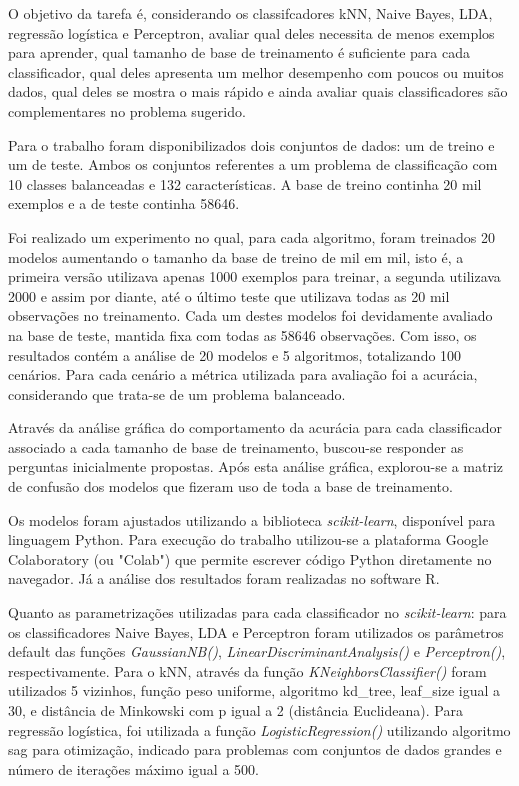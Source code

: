 \documentclass[
	12pt,				%
	openright,			%
	twoside,			%
	a4paper,			%
	english,			%
	brazil,				%
	svgnames
	]{abntex2}\usepackage[]{graphicx}\usepackage[]{color}
\begin{document}
O objetivo da tarefa é, considerando os classifcadores kNN, Naive Bayes, LDA, regressão logística e Perceptron, avaliar qual deles necessita de menos exemplos para aprender, qual tamanho de base de treinamento é suficiente para cada classificador, qual deles apresenta um melhor desempenho com poucos ou muitos dados, qual deles se mostra o mais rápido e ainda avaliar quais classificadores são complementares no problema sugerido.

Para o trabalho foram disponibilizados dois conjuntos de dados: um de treino e um de teste. Ambos os conjuntos referentes a um problema de classificação com 10 classes balanceadas e 132 características. A base de treino continha 20 mil exemplos e a de teste continha 58646.

Foi realizado um experimento no qual, para cada algoritmo, foram treinados 20 modelos aumentando o tamanho da base de treino de mil em mil, isto é, a primeira versão utilizava apenas 1000 exemplos para treinar, a segunda utilizava 2000 e assim por diante, até o último teste que utilizava todas as 20 mil observações no treinamento. Cada um destes modelos foi devidamente avaliado na base de teste, mantida fixa com todas as 58646 observações. Com isso, os resultados contém a análise de 20 modelos e 5 algoritmos, totalizando 100 cenários. Para cada cenário a métrica utilizada para avaliação foi a acurácia, considerando que trata-se de um problema balanceado.

Através da análise gráfica do comportamento da acurácia para cada classificador associado a cada tamanho de base de treinamento, buscou-se responder as perguntas inicialmente propostas. Após esta análise gráfica, explorou-se a matriz de confusão dos modelos que fizeram uso de toda a base de treinamento. 

Os modelos foram ajustados utilizando a biblioteca \emph{scikit-learn}, disponível para linguagem Python. Para execução do trabalho utilizou-se a plataforma Google Colaboratory (ou "Colab") que permite escrever código Python diretamente no navegador. Já a análise dos resultados foram realizadas no software R.

Quanto as parametrizações utilizadas para cada classificador no \emph{scikit-learn}: para os classificadores Naive Bayes, LDA e Perceptron foram utilizados os parâmetros default das funções \emph{GaussianNB()}, \emph{LinearDiscriminantAnalysis()} e \emph{Perceptron()}, respectivamente. Para o kNN, através da função \emph{KNeighborsClassifier()} foram utilizados 5 vizinhos, função peso uniforme, algoritmo kd\_tree, leaf\_size igual a 30, e distância de Minkowski com p igual a 2 (distância Euclideana). Para regressão logística, foi utilizada a função \emph{LogisticRegression()} utilizando algoritmo sag para otimização, indicado para problemas com conjuntos de dados grandes e número de iterações máximo igual a 500.
\end{document}
